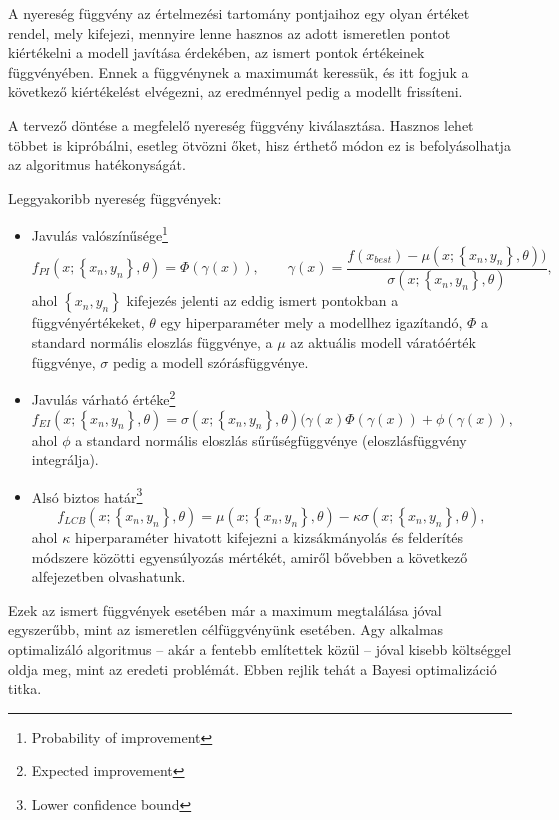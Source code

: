 A nyereség függvény az értelmezési tartomány pontjaihoz egy olyan értéket rendel, mely kifejezi, mennyire lenne hasznos az adott ismeretlen pontot kiértékelni a modell javítása érdekében, az ismert pontok értékeinek függvényében. Ennek a függvénynek a maximumát keressük, és itt fogjuk a következő kiértékelést elvégezni, az eredménnyel pedig a modellt frissíteni.

A tervező döntése a megfelelő nyereség függvény kiválasztása. Hasznos lehet többet is kipróbálni, esetleg ötvözni őket, hisz érthető módon ez is befolyásolhatja az algoritmus hatékonyságát.

Leggyakoribb nyereség függvények\cite{AcqFgvCikk}:
\begin{itemize}
	\item Javulás valószínűsége\footnote{Probability of improvement}\\
	\begin{equation}
	\label{eq:POI}
		f_{PI}(x;\left\lbrace x_n,y_n\right\rbrace ,\theta)=\Phi(\gamma(x)), \qquad \gamma(x)=\frac{f(x_{best})-\mu(x;\left\lbrace x_n,y_n\right\rbrace ,\theta))}{\sigma(x; \left\lbrace x_n,y_n\right\rbrace ,\theta)},
	\end{equation}
	ahol $\left\lbrace x_n,y_n\right\rbrace$  kifejezés jelenti az eddig ismert pontokban a függvényértékeket, $\theta$ egy hiperparaméter mely a modellhez igazítandó, $\Phi$ a standard normális eloszlás függvénye, a  $\mu$ az aktuális modell váratóérték függvénye, $\sigma$ pedig a modell szórásfüggvénye.
	\item Javulás várható értéke\footnote{Expected improvement}
	\begin{equation}
	\label{eq:EI}
		f_{EI}(x;\left\lbrace x_n,y_n\right\rbrace ,\theta)=\sigma(x;\left\lbrace x_n,y_n\right\rbrace ,\theta)(\gamma(x)\Phi(\gamma(x))+\phi(\gamma(x)),
	\end{equation}
	ahol $\phi$ a standard normális eloszlás sűrűségfüggvénye (eloszlásfüggvény integrálja).
	\item Alsó biztos határ\footnote{Lower confidence bound}
	\begin{equation}
	\label{eq:LCB}
		f_{LCB}(x;\left\lbrace x_n,y_n\right\rbrace ,\theta)=\mu(x;\left\lbrace x_n,y_n\right\rbrace ,\theta)-\kappa \sigma(x;\left\lbrace x_n,y_n\right\rbrace ,\theta),
	\end{equation}
	ahol $\kappa$ hiperparaméter hivatott kifejezni a kizsákmányolás és felderítés módszere közötti egyensúlyozás mértékét, amiről bővebben a következő alfejezetben olvashatunk.
\end{itemize}
Ezek az ismert függvények esetében már a maximum megtalálása jóval egyszerűbb, mint az ismeretlen célfüggvényünk esetében. Agy alkalmas optimalizáló algoritmus -- akár a fentebb említettek közül -- jóval kisebb költséggel oldja meg, mint az eredeti problémát. Ebben rejlik tehát a Bayesi optimalizáció titka.

